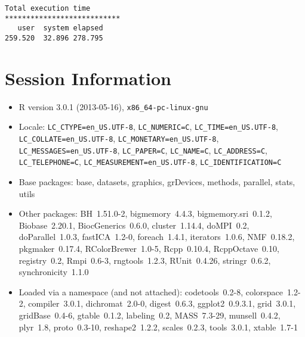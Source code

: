 \documentclass[10pt]{article}\usepackage[]{graphicx}\usepackage[]{color}
\begin{document}
\begin{verbatim}
Total execution time
***************************
   user  system elapsed 
259.520  32.896 278.795 

\end{verbatim}

\section*{Session Information}
\begin{itemize}\raggedright
  \item R version 3.0.1 (2013-05-16), \verb|x86_64-pc-linux-gnu|
  \item Locale: \verb|LC_CTYPE=en_US.UTF-8|, \verb|LC_NUMERIC=C|, \verb|LC_TIME=en_US.UTF-8|, \verb|LC_COLLATE=en_US.UTF-8|, \verb|LC_MONETARY=en_US.UTF-8|, \verb|LC_MESSAGES=en_US.UTF-8|, \verb|LC_PAPER=C|, \verb|LC_NAME=C|, \verb|LC_ADDRESS=C|, \verb|LC_TELEPHONE=C|, \verb|LC_MEASUREMENT=en_US.UTF-8|, \verb|LC_IDENTIFICATION=C|
  \item Base packages: base, datasets, graphics, grDevices, methods,
    parallel, stats, utils
  \item Other packages: BH~1.51.0-2, bigmemory~4.4.3,
    bigmemory.sri~0.1.2, Biobase~2.20.1, BiocGenerics~0.6.0,
    cluster~1.14.4, doMPI~0.2, doParallel~1.0.3, fastICA~1.2-0,
    foreach~1.4.1, iterators~1.0.6, NMF~0.18.2, pkgmaker~0.17.4,
    RColorBrewer~1.0-5, Rcpp~0.10.4, RcppOctave~0.10, registry~0.2,
    Rmpi~0.6-3, rngtools~1.2.3, RUnit~0.4.26, stringr~0.6.2,
    synchronicity~1.1.0
  \item Loaded via a namespace (and not attached): codetools~0.2-8,
    colorspace~1.2-2, compiler~3.0.1, dichromat~2.0-0, digest~0.6.3,
    ggplot2~0.9.3.1, grid~3.0.1, gridBase~0.4-6, gtable~0.1.2,
    labeling~0.2, MASS~7.3-29, munsell~0.4.2, plyr~1.8, proto~0.3-10,
    reshape2~1.2.2, scales~0.2.3, tools~3.0.1, xtable~1.7-1
\end{itemize}
\end{document}
